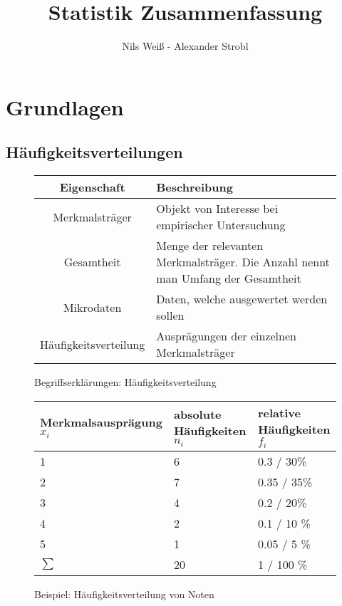 \documentclass[10pt,a4paper]{article}
\begin{document}
\newcommand{\abs}[1]{\ensuremath{\left\vert#1\right\vert}}

\newcommand{\ENDV}{\hspace{5mm} \vline \hspace{1mm}}
\newcommand{\LHospital}{\stackrel{L'H}{=}}
\newcommand{\two}{\nodepart{two}}
\newcommand{\three}{\nodepart{three}}
\newcommand{\four}{\nodepart{four}}
\newcommand{\TablePos}{!htbp}
\newcommand{\LargeRowSize}{\renewcommand{\arraystretch}{1.5}}
\newcommand{\largeRowSize}{\renewcommand{\arraystretch}{1.2}}
\newcommand{\normalRowSize}{\renewcommand{\arraystretch}{1}}
\newcommand{\DefaultTabular}{|c|c|p{9cm}|}

\title{Statistik Zusammenfassung}
\author{Nils Weiß - Alexander Strobl}

\maketitle
\tableofcontents

\newpage
\section{Grundlagen}

\subsection{Häufigkeitsverteilungen}

\begin{figure}[!h]
\begin{tabular}{|c|p{8cm}|} 
\hline Eigenschaft & Beschreibung \\ 
\hline Merkmalsträger & Objekt von Interesse bei empirischer Untersuchung\\ 
\hline Gesamtheit & Menge der relevanten Merkmalsträger. Die Anzahl nennt man Umfang der Gesamtheit \\
\hline Mikrodaten & Daten, welche ausgewertet werden sollen \\
\hline Häufigkeitsverteilung & Ausprägungen der einzelnen Merkmalsträger \\
\hline
\end{tabular}
\caption{Begriffserklärungen: Häufigkeitsverteilung}
\end{figure}

\begin{figure}[!h]
\begin{tabular}{|p{3cm}|p{3cm}|p{3cm}|} 
\hline Merkmalsausprägung $x_i$ & absolute Häufigkeiten $n_i$ & relative Häufigkeiten $f_i$ \\
\hline 1 & 6 & 0.3 / 30\% \\
\hline 2 & 7 & 0.35 / 35\% \\
\hline 3 & 4 & 0.2 / 20\%\\
\hline 4 & 2 & 0.1 / 10 \%\\
\hline 5 & 1 & 0.05 / 5 \%\\
\hline $\sum$ & 20 & 1 / 100 \%\\
\hline 
\end{tabular}
\caption{Beispiel: Häufigkeitsverteilung von Noten}
\end{figure}
\end{document}
